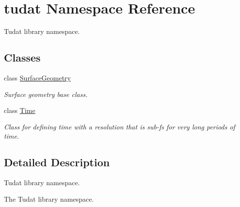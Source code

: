 \hypertarget{namespacetudat}{}\section{tudat Namespace Reference}
\label{namespacetudat}


Tudat library namespace.  


\subsection*{Classes}
\begin{DoxyCompactItemize}
\item 
class \hyperlink{classtudat_1_1SurfaceGeometry}{Surface\+Geometry}
\begin{DoxyCompactList}\small\item\em Surface geometry base class. \end{DoxyCompactList}\item 
class \hyperlink{classtudat_1_1Time}{Time}
\begin{DoxyCompactList}\small\item\em Class for defining time with a resolution that is sub-\/fs for very long periods of time. \end{DoxyCompactList}\end{DoxyCompactItemize}


\subsection{Detailed Description}
Tudat library namespace. 

The Tudat library namespace. 